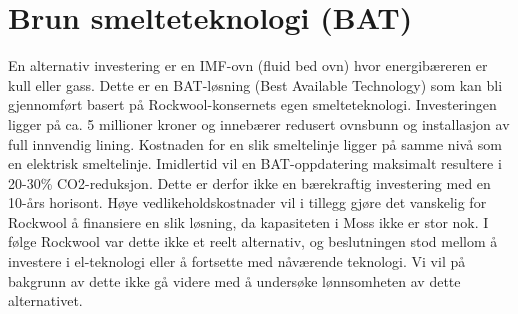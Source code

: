 \section{Brun smelteteknologi (BAT)}
En alternativ investering er en IMF-ovn (fluid bed ovn) hvor energibæreren er kull eller gass. Dette er en BAT-løsning (Best Available Technology) som kan bli gjennomført basert på Rockwool-konsernets egen smelteteknologi. Investeringen ligger på ca. 5 millioner kroner og innebærer redusert ovnsbunn og installasjon av full innvendig lining. Kostnaden for en slik smeltelinje ligger på samme nivå som en elektrisk smeltelinje. Imidlertid vil en BAT-oppdatering maksimalt resultere i 20-30\% CO2-reduksjon. Dette er derfor ikke en bærekraftig investering med en 10-års horisont. Høye vedlikeholdskostnader vil i tillegg gjøre det vanskelig for Rockwool å finansiere en slik løsning, da kapasiteten i Moss ikke er stor nok. I følge Rockwool var dette ikke et reelt alternativ, og beslutningen stod mellom å investere i el-teknologi eller å fortsette med nåværende teknologi. Vi vil på bakgrunn av dette ikke gå videre med å undersøke lønnsomheten av dette alternativet.
